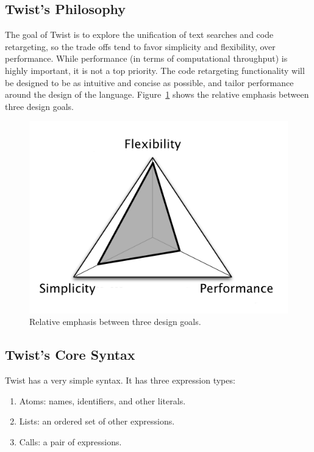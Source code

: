 \subsection{Twist's Philosophy}
\label{sec:philosophy}

The goal of Twist is to explore the unification of text searches and code retargeting, so the trade offs tend to favor simplicity and flexibility, over performance. While performance (in terms of computational throughput) is highly important, it is not a top priority. The code retargeting functionality will be designed to be as intuitive and concise as possible, and tailor performance around the design of the language. Figure~\ref{fig:focalpoints} shows the relative emphasis between three design goals.

\begin{figure}[!ht]
    \centering
    \includegraphics[width=\textwidth]{images/focalpoints}
    \caption{Relative emphasis between three design goals.}
    \label{fig:focalpoints}
\end{figure}

\subsection{Twist's Core Syntax}
\label{sec:syntax}

Twist has a very simple syntax. It has three expression types: 

\begin{enumerate}
	\item Atoms: names, identifiers, and other literals.
	\item Lists: an ordered set of other expressions. 
	\item Calls: a pair of expressions.
\end{enumerate}

